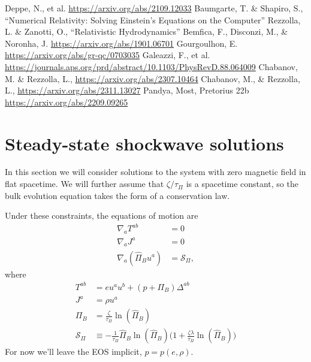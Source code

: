 \documentclass[12pt]{article}
\numberwithin{equation}{section}
\begin{document}
\begin{thebibliography}{10}
 Deppe, N., et al. \url{https://arxiv.org/abs/2109.12033}
 Baumgarte, T. \& Shapiro, S., ``Numerical Relativity: Solving Einstein's Equations on the Computer''
 Rezzolla, L. \& Zanotti, O., ``Relativistic Hydrodynamics''
 Bemfica, F., Disconzi, M., \& Noronha, J. \url{https://arxiv.org/abs/1901.06701}
 Gourgoulhon, E. \url{https://arxiv.org/abs/gr-qc/0703035}
 Galeazzi, F., et al. \url{https://journals.aps.org/prd/abstract/10.1103/PhysRevD.88.064009}
 Chabanov, M. \& Rezzolla, L., \url{https://arxiv.org/abs/2307.10464}
 Chabanov, M., \& Rezzolla, L., \url{https://arxiv.org/abs/2311.13027}
 Pandya, Most, Pretorius 22b \url{https://arxiv.org/abs/2209.09265}
\end{thebibliography}

\clearpage

\appendix

\clearpage

\section{Steady-state shockwave solutions}

In this section we will consider solutions to the system with zero magnetic field in flat spacetime.
We will further assume that $\zeta/\tau_{\Pi}$ is a spacetime constant, so the bulk evolution equation takes the form of a conservation law.

Under these constraints, the equations of motion are
\begin{align}
\nabla_a T^{ab} &= 0 \\
\nabla_a J^a &= 0\\
\nabla_a (\hat{\Pi}_B u^a) &= \mathcal{S}_\Pi,
\end{align}
where
\begin{align}
T^{ab} &= e u^a u^b + (p + \Pi_B) \Delta^{ab} \\
J^a &= \rho u^a \\
\Pi_B &= \frac{\zeta}{\tau_{\Pi}} \ln(\hat{\Pi}_B) \\
\mathcal{S}_\Pi &\equiv - \frac{1}{\tau_\Pi} \hat{\Pi}_B \ln(\hat{\Pi}_B) \Big( 1 + \frac{\zeta \lambda}{\tau_\Pi} \ln(\hat{\Pi}_B) \Big)
\end{align}
For now we'll leave the EOS implicit, $p = p(e, \rho)$.
\end{document}
